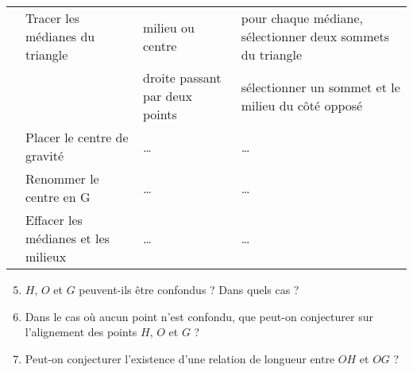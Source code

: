 \begin{enigme}
\begin{changemargin}{-5mm}{-15mm}
\begin{tabular}{|cp{5.5cm}|p{4.5cm}|p{5cm}|}
                                  & Tracer les médianes du triangle                                                                       & milieu ou centre               & pour chaque médiane, sélectionner deux sommets du triangle    \\
                                  &                                                                                                       & droite passant par deux points & sélectionner un sommet et le milieu du côté opposé            \\
                                  & Placer le centre de gravité                                                                           & \dots                          & \dots                                                         \\
                                  & Renommer le centre en G                                                                               & \dots                          & \dots                                                         \\
                                  & Effacer les médianes et les milieux                                                                   & \dots                          & \dots                                                         \\
            \hline
        \end{tabular}
        \bigskip

        \partie[constatations]
        \vspace*{-5mm}
        \begin{enumerate}
            \setcounter{enumi}{4}
            \item $H$, $O$ et $G$ peuvent-ils être confondus ? Dans quels cas ? \par \medskip
                  \pointilles \medskip
            \item Dans le cas où aucun point n'est confondu, que peut-on conjecturer sur l'alignement des points $H$, $O$ et $G$ ? \par \medskip
                  \pointilles \medskip
            \item Peut-on conjecturer l'existence d'une relation de longueur entre $OH$ et $OG$ ? \par \medskip
                  \pointilles
        \end{enumerate}
    \end{changemargin}    
\end{enigme}

